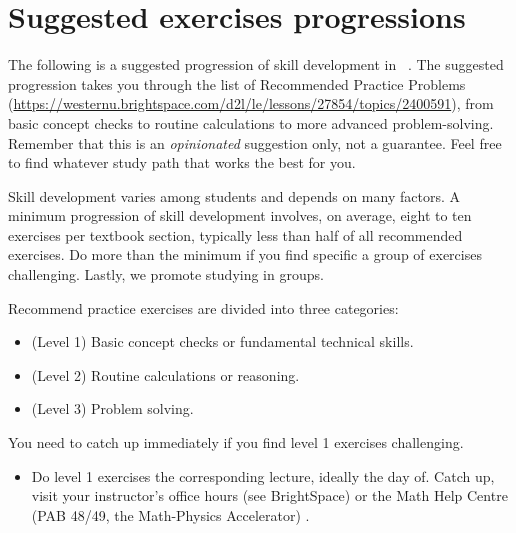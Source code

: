 \documentclass[../main.tex]{subfiles}
\begin{document}
\pagestyle{empty}
\section*{Suggested exercises progressions}

The following is a suggested progression of skill development in \thecoursesubject{}~\thecoursenumb{}.  The suggested progression takes you through the list of Recommended Practice Problems (\url{https://westernu.brightspace.com/d2l/le/lessons/27854/topics/2400591}), from basic concept checks to routine calculations to more advanced problem-solving.  Remember that this is an \emph{opinionated} suggestion only, not a guarantee. Feel free to find whatever study path that works the best for you.

Skill development varies among students and depends on many factors. A minimum progression of skill development involves, on average, eight to ten exercises per textbook section, typically less than half of all recommended exercises. Do more than the minimum if you find specific a group of exercises challenging. Lastly, we promote studying in groups.

Recommend practice exercises are divided into three categories: 
\begin{itemize}
  \item (Level 1) Basic concept checks or fundamental technical skills.
  \item (Level 2) Routine calculations or reasoning.
  \item (Level 3) Problem solving.
\end{itemize}

You need to catch up immediately if you find level 1 exercises challenging.
\begin{itemize}
  \item Do level 1 exercises  the corresponding lecture, ideally the day of. Catch up, visit your instructor's office hours (see BrightSpace) or the Math Help Centre (PAB 48/49, the Math-Physics Accelerator) .
\end{itemize}
\end{document}
